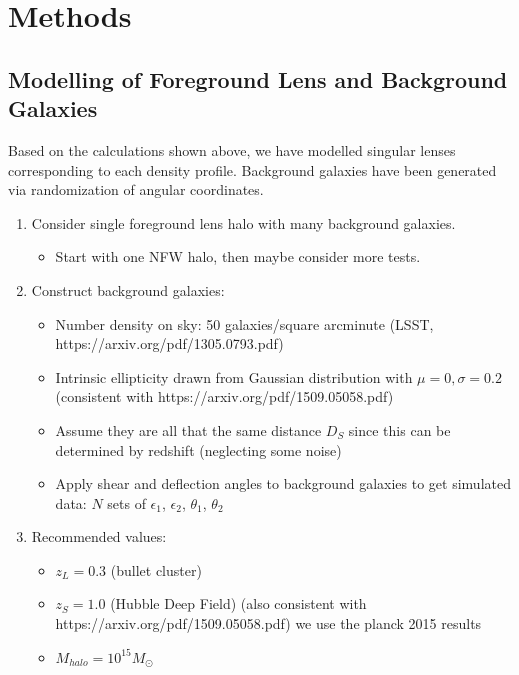 \documentclass[10pt]{article}
\begin{document}
\section{Methods}

\subsection{Modelling of Foreground Lens and Background Galaxies}
Based on the calculations shown above, we have modelled singular lenses corresponding to each density profile.
 Background galaxies have been generated via randomization of angular coordinates.

\begin{enumerate}
    \item Consider single foreground lens halo with many background galaxies.
    \begin{itemize}
        \item Start with one NFW halo, then maybe consider more tests.
    \end{itemize}
    \item Construct background galaxies:
    \begin{itemize}
        \item Number density on sky: 50 galaxies/square arcminute (LSST, https://arxiv.org/pdf/1305.0793.pdf)
        \item Intrinsic ellipticity drawn from Gaussian distribution with $\mu=0, \sigma=0.2$ (consistent with https://arxiv.org/pdf/1509.05058.pdf)
        \item Assume they are all that the same distance $D_S$ since this can be determined by redshift (neglecting some noise)
        \item Apply shear and deflection angles to background galaxies to get simulated data: $N$ sets of $\epsilon_1$, $\epsilon_2$, $\theta_1$, $\theta_2$
    \end{itemize}
    \item Recommended values:
    \begin{itemize}
        \item $z_L = 0.3$ (bullet cluster)
        \item $z_S = 1.0$ (Hubble Deep Field) (also consistent with https://arxiv.org/pdf/1509.05058.pdf)
        we use the planck 2015 results
        \item $M_{halo} = 10^{15} M_\odot$
    \end{itemize}
\end{enumerate}
\end{document}
